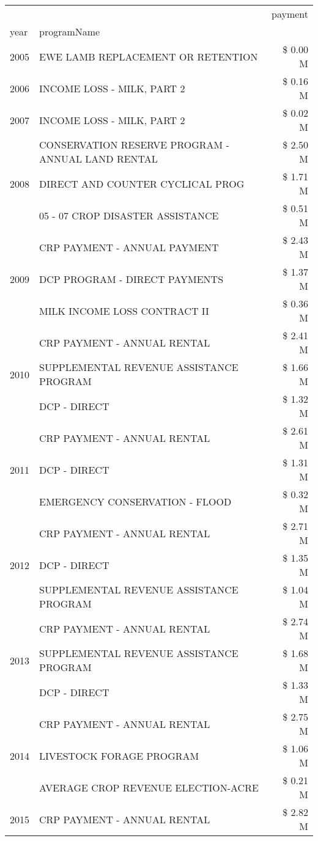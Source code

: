 \begin{tabular}{llr}
\toprule
 &  & payment \\
year & programName &  \\
\midrule
2005 & EWE LAMB REPLACEMENT OR RETENTION & \$ 0.00 M \\
\cline{1-3}
2006 & INCOME LOSS - MILK, PART 2 & \$ 0.16 M \\
\cline{1-3}
2007 & INCOME LOSS - MILK, PART 2 & \$ 0.02 M \\
\cline{1-3}
\multirow[t]{3}{*}{2008} & CONSERVATION RESERVE PROGRAM - ANNUAL LAND RENTAL & \$ 2.50 M \\
 & DIRECT AND COUNTER CYCLICAL PROG & \$ 1.71 M \\
 & 05 - 07 CROP DISASTER ASSISTANCE & \$ 0.51 M \\
\cline{1-3}
\multirow[t]{3}{*}{2009} & CRP PAYMENT - ANNUAL PAYMENT & \$ 2.43 M \\
 & DCP PROGRAM - DIRECT PAYMENTS & \$ 1.37 M \\
 & MILK INCOME LOSS CONTRACT II & \$ 0.36 M \\
\cline{1-3}
\multirow[t]{3}{*}{2010} & CRP PAYMENT - ANNUAL RENTAL & \$ 2.41 M \\
 & SUPPLEMENTAL REVENUE ASSISTANCE PROGRAM & \$ 1.66 M \\
 & DCP - DIRECT & \$ 1.32 M \\
\cline{1-3}
\multirow[t]{3}{*}{2011} & CRP PAYMENT - ANNUAL RENTAL & \$ 2.61 M \\
 & DCP - DIRECT & \$ 1.31 M \\
 & EMERGENCY CONSERVATION - FLOOD & \$ 0.32 M \\
\cline{1-3}
\multirow[t]{3}{*}{2012} & CRP PAYMENT - ANNUAL RENTAL & \$ 2.71 M \\
 & DCP - DIRECT & \$ 1.35 M \\
 & SUPPLEMENTAL REVENUE ASSISTANCE PROGRAM & \$ 1.04 M \\
\cline{1-3}
\multirow[t]{3}{*}{2013} & CRP PAYMENT - ANNUAL RENTAL & \$ 2.74 M \\
 & SUPPLEMENTAL REVENUE ASSISTANCE PROGRAM & \$ 1.68 M \\
 & DCP - DIRECT & \$ 1.33 M \\
\cline{1-3}
\multirow[t]{3}{*}{2014} & CRP PAYMENT - ANNUAL RENTAL & \$ 2.75 M \\
 & LIVESTOCK FORAGE PROGRAM & \$ 1.06 M \\
 & AVERAGE CROP REVENUE ELECTION-ACRE & \$ 0.21 M \\
\cline{1-3}
\multirow[t]{3}{*}{2015} & CRP PAYMENT - ANNUAL RENTAL & \$ 2.82 M \\

\end{tabular}
